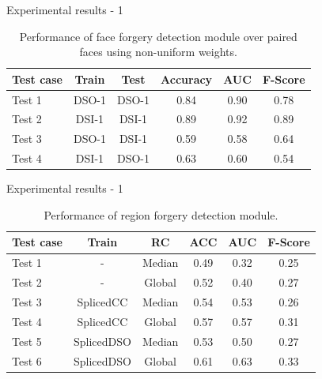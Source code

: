 \begin{tframe}{Experimental results - 1}
\begin{table}[h!]
\centering
\begin{tabular}{l c c c c c} 
\hline \hline 
\textbf{Test case} & \textbf{Train} & \textbf{Test} & \textbf{Accuracy} & \textbf{AUC} &\textbf{ F-Score} \\ [0.5ex]
\hline
Test 1 & DSO-1 & DSO-1 &	0.84 & 0.90	& 0.78\\
Test 2 & DSI-1 & DSI-1 &	0.89 & 0.92 & 0.89\\
Test 3 &	DSO-1 &	DSI-1 &	0.59 & 0.58 & 0.64\\
Test 4 &	DSI-1 & DSO-1 & 0.63 & 0.60 & 0.54\\ [1ex]
\hline
\end{tabular}
\caption{Performance of face forgery detection module over paired faces using non-uniform weights.}
\end{table}
\end{tframe}


\begin{tframe}{Experimental results - 1}
\begin{table}[h!]
\centering
\begin{tabular}{l c c c c c} 
\hline \hline 
\textbf{Test case} & \textbf{Train} & \textbf{RC} & \textbf{ACC} & \textbf{AUC} &\textbf{ F-Score} \\ [0.5ex]
\hline
Test 1 & - & Median & 0.49 & 0.32 & 0.25\\
Test 2 & - & Global & 0.52 & 0.40 & 0.27\\
Test 3 & SplicedCC & Median & 0.54 & 0.53 & 0.26\\
Test 4 & SplicedCC & Global & 0.57 & 0.57 & 0.31\\
Test 5 &	 SplicedDSO & Median & 0.53 & 0.50 & 0.27\\
Test 6 &	 SplicedDSO & Global & 0.61 & 0.63 & 0.33\\ [1ex]
\hline
\end{tabular}
\caption{Performance of region forgery detection module.}
\label{table:performanceregionaldet}
\end{table}
\end{tframe}

